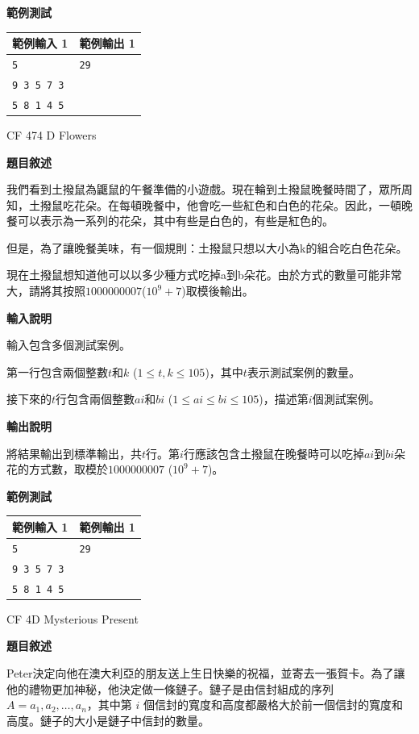     \textbf{範例測試}

    \begin{tabular}{|m{7cm}|m{7cm}|}
        \hline
        範例輸入 1 & 範例輸出 1 \\
        \hline
        \verb|5| & \verb|29| \\
        \verb|9 3 5 7 3| & \\
        \verb|5 8 1 4 5| & \\
        \hline
    \end{tabular}

    \problem CF 474 D Flowers

    \textbf{題目敘述}

    我們看到土撥鼠為鼴鼠的午餐準備的小遊戲。現在輪到土撥鼠晚餐時間了，眾所周知，土撥鼠吃花朵。在每頓晚餐中，他會吃一些紅色和白色的花朵。因此，一頓晚餐可以表示為一系列的花朵，其中有些是白色的，有些是紅色的。

    但是，為了讓晚餐美味，有一個規則：土撥鼠只想以大小為k的組合吃白色花朵。

    現在土撥鼠想知道他可以以多少種方式吃掉a到b朵花。由於方式的數量可能非常大，請將其按照$1000000007$($10^9+7$)取模後輸出。

    \textbf{輸入說明}

    輸入包含多個測試案例。

    第一行包含兩個整數$t$和$k$ ($1\leq t, k\leq 105$)，其中$t$表示測試案例的數量。

    接下來的$t$行包含兩個整數$ai$和$bi$ ($1\leq ai\leq bi\leq 105$)，描述第$i$個測試案例。

    \textbf{輸出說明}

    將結果輸出到標準輸出，共$t$行。第$i$行應該包含土撥鼠在晚餐時可以吃掉$ai$到$bi$朵花的方式數，取模於$1000000007$ ($10^9+7$)。

    \textbf{範例測試}

    \begin{tabular}{|m{7cm}|m{7cm}|}
        \hline
        範例輸入 1 & 範例輸出 1 \\
        \hline
        \verb|5| & \verb|29| \\
        \verb|9 3 5 7 3| & \\
        \verb|5 8 1 4 5| & \\
        \hline
    \end{tabular}

    \problem CF 4D Mysterious Present

    \textbf{題目敘述}

    Peter決定向他在澳大利亞的朋友送上生日快樂的祝福，並寄去一張賀卡。為了讓他的禮物更加神秘，他決定做一條鏈子。鏈子是由信封組成的序列 $A={a_1, a_2, \ldots, a_n}$，其中第 $i$ 個信封的寬度和高度都嚴格大於前一個信封的寬度和高度。鏈子的大小是鏈子中信封的數量。

